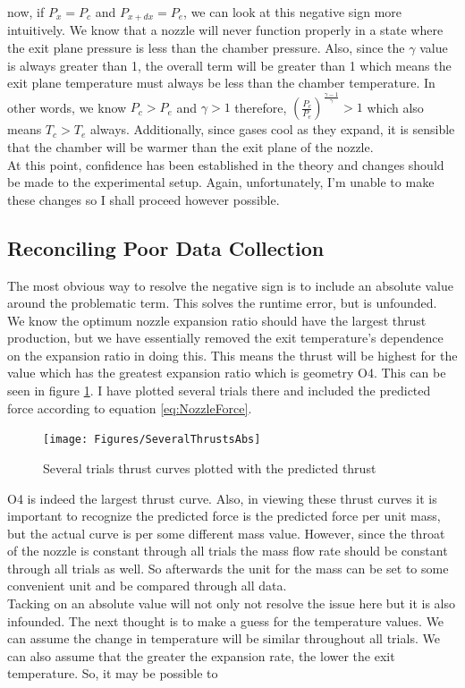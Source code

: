 now, if $P_x=P_c$ and $P_{x+dx}=P_e$, we can look at this negative sign more intuitively. We know that a nozzle will never function properly in a state where the exit plane pressure is less than the chamber pressure. Also, since the $\gamma$ value is always greater than 1, the overall term will be greater than 1 which means the exit plane temperature must always be less than the chamber temperature. In other words, we know $P_c>P_e$ and $\gamma>1$ therefore, $\left(\frac{P_c}{P_e}\right)^{\frac{\gamma-1}{\gamma}}>1$ which also means $T_c>T_e$ always. Additionally, since gases cool as they expand, it is sensible that the chamber will be warmer than the exit plane of the nozzle.\\
At this point, confidence has been established in the theory and changes should be made to the experimental setup. Again, unfortunately, I'm unable to make these changes so I shall proceed however possible.\\
\subsection{Reconciling Poor Data Collection}
The most obvious way to resolve the negative sign is to include an absolute value around the problematic term. This solves the runtime error, but is unfounded. We know the optimum nozzle expansion ratio should have the largest thrust production, but we have essentially removed the exit temperature's dependence on the expansion ratio in doing this. This means the thrust will be highest for the value which has the greatest expansion ratio which is geometry O4. This can be seen in figure \ref{fig:ForcesAbs}. I have plotted several trials there and included the predicted force according to equation \ref{eq:NozzleForce}.
\begin{figure}[h!]
\centering
\texttt{[image: Figures/SeveralThrustsAbs]}
\caption{Several trials thrust curves plotted with the predicted thrust}
\label{fig:ForcesAbs}
\end{figure}
O4 is indeed the largest thrust curve. Also, in viewing these thrust curves it is important to recognize the predicted force is the predicted force per unit mass, but the actual curve is per some different mass value. However, since the throat of the nozzle is constant through all trials the mass flow rate should be constant through all trials as well. So afterwards the unit for the mass can be set to some convenient unit and be compared through all data.\\
Tacking on an absolute value will not only not resolve the issue here but it is also infounded. The next thought is to make a guess for the temperature values. We can assume the change in temperature will be similar throughout all trials. We can also assume that the greater the expansion rate, the lower the exit temperature. So, it may be possible to